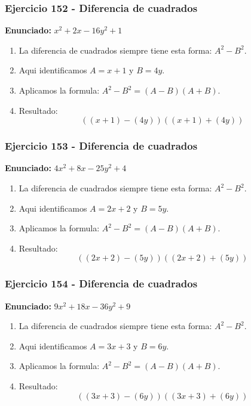 \documentclass[11pt,a4paper]{article}
\begin{document}
\vspace{0.2cm}
\subsubsection*{Ejercicio 152 - Diferencia de cuadrados}
\textbf{Enunciado:} $ x^{2} + 2 x - 16 y^{2} + 1 $\par
\begin{enumerate}[leftmargin=2em]
\item La diferencia de cuadrados siempre tiene esta forma: \(A^2-B^2\).
\item Aqui identificamos \(A=x + 1\) y \(B=4 y\).
\item Aplicamos la formula: \(A^2-B^2=(A-B)(A+B)\).
\item Resultado: \[\boxed{\left(\left(x + 1\right)-\left(4 y\right)\right)\left(\left(x + 1\right)+\left(4 y\right)\right)}\]
\end{enumerate}

\vspace{0.2cm}
\subsubsection*{Ejercicio 153 - Diferencia de cuadrados}
\textbf{Enunciado:} $ 4 x^{2} + 8 x - 25 y^{2} + 4 $\par
\begin{enumerate}[leftmargin=2em]
\item La diferencia de cuadrados siempre tiene esta forma: \(A^2-B^2\).
\item Aqui identificamos \(A=2 x + 2\) y \(B=5 y\).
\item Aplicamos la formula: \(A^2-B^2=(A-B)(A+B)\).
\item Resultado: \[\boxed{\left(\left(2 x + 2\right)-\left(5 y\right)\right)\left(\left(2 x + 2\right)+\left(5 y\right)\right)}\]
\end{enumerate}

\vspace{0.2cm}
\subsubsection*{Ejercicio 154 - Diferencia de cuadrados}
\textbf{Enunciado:} $ 9 x^{2} + 18 x - 36 y^{2} + 9 $\par
\begin{enumerate}[leftmargin=2em]
\item La diferencia de cuadrados siempre tiene esta forma: \(A^2-B^2\).
\item Aqui identificamos \(A=3 x + 3\) y \(B=6 y\).
\item Aplicamos la formula: \(A^2-B^2=(A-B)(A+B)\).
\item Resultado: \[\boxed{\left(\left(3 x + 3\right)-\left(6 y\right)\right)\left(\left(3 x + 3\right)+\left(6 y\right)\right)}\]
\end{enumerate}
\end{document}
